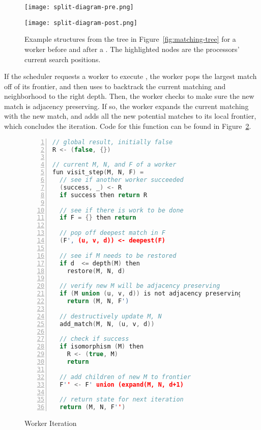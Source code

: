 \begin{figure}
\centering
  \begin{minipage}[c]{\textwidth}
    \texttt{[image: split-diagram-pre.png]}
  \end{minipage}
  \begin{minipage}[c]{\textwidth}
    \texttt{[image: split-diagram-post.png]}
  \end{minipage}
  \caption{Example structures from the tree in Figure~\ref{fig:matching-tree}
    for a worker before and after a .
    The highlighted nodes are the processors' current search positions.}
  \label{fig:split-step}
\end{figure}

If the scheduler requests a worker to
execute , the worker
pops the largest match off of its frontier,
and then uses  to backtrack the
current matching and neighborhood to the right depth.
%
Then, the worker checks to make sure the new match
is adjacency preserving.
%
If so, the worker expands the current matching with
the new match, and adds all the new potential matches
to its local frontier, which concludes the iteration.
%
Code for this function can be found in Figure~\ref{worker-par-alg}.

%
\begin{figure}
\begin{lstlisting}[language=c, numbers=left]
// global result, initially false 
R <- (false, {})

// current M, N, and F of a worker 
fun visit_step(M, N, F) =
  // see if another worker succeeded 
  (success, _) <- R
  if success then return R

  // see if there is work to be done 
  if F = {} then return

  // pop off deepest match in F 
  (F', (u, v, d)) <- deepest(F)

  // see if M needs to be restored 
  if d  <= depth(M) then
    restore(M, N, d)

  // verify new M will be adjacency preserving 
  if (M union (u, v, d)) is not adjacency preserving then
    return (M, N, F')

  // destructively update M, N 
  add_match(M, N, (u, v, d))

  // check if success 
  if isomorphism (M) then
    R <- (true, M)
    return

  // add children of new M to frontier 
  F'' <- F' union (expand(M, N, d+1)

  // return state for next iteration 
  return (M, N, F'')
\end{lstlisting}
\caption{Worker Iteration}
\label{worker-par-alg}
\end{figure}


